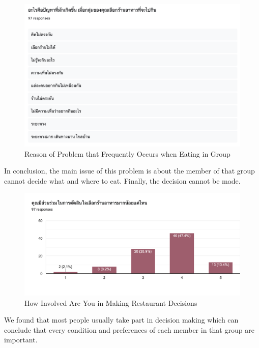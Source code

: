 \documentclass[12pt,oneside,openright,a4paper]{cpe-english-project}
\begin{document}
\begin{figure}[H]\centering
\includegraphics[width=350pt]{./images/A1ReasonofProblemthatFrequentlyOccurswhenEatinginGroup.png}
\caption{Reason of Problem that Frequently Occurs when Eating in Group}\label{fig:A1ReasonofProblemthatFrequentlyOccurswhenEatinginGroup}
\end{figure}

In conclusion, the main issue of this problem is about the member of that group cannot decide what and where to eat. Finally, the decision cannot be made.

\begin{figure}[H]\centering
\includegraphics[width=350pt]{./images/A1HowInvolvedAreYouinMakingRestaurantDecisions.png}
\caption{How Involved Are You in Making Restaurant Decisions}\label{fig:A1HowInvolvedAreYouinMakingRestaurantDecisions}
\end{figure}

We found that most people usually take part in decision making which can conclude that every condition and preferences of each member in that group are important.
\end{document}
